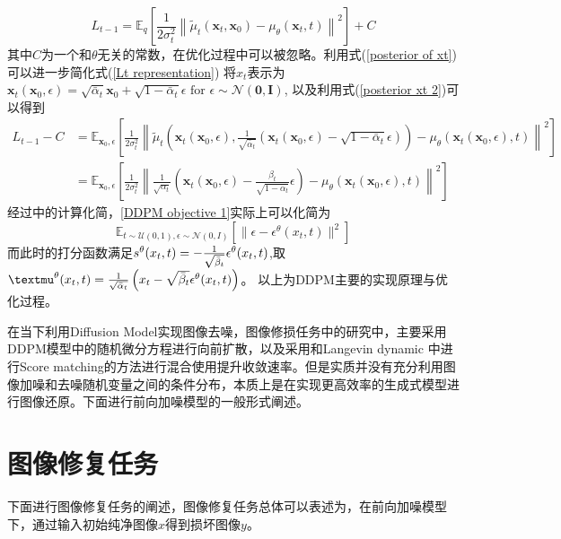 \begin{equation}
    L_{t-1}=\mathbb{E}_q\left[\frac{1}{2 \sigma_t^2}\left\|\tilde{{\mu}}_t\left(\mathbf{x}_t, \mathbf{x}_0\right)-{\mu}_\theta\left(\mathbf{x}_t, t\right)\right\|^2\right]+C
    \label{Lt representation}
\end{equation}
其中$C$为一个和$\theta$无关的常数，在优化过程中可以被忽略。利用式(\ref{posterior of xt})可以进一步简化式(\ref{Lt representation}) 将$x_t$表示为$\mathbf{x}_t\left(\mathbf{x}_0, {\epsilon}\right)=\sqrt{\bar{\alpha}_t} \mathbf{x}_0+\sqrt{1-\bar{\alpha}_t} {\epsilon} \text { for } {\epsilon} \sim \mathcal{N}(\mathbf{0}, \mathbf{I}) $, 以及利用式(\ref{posterior xt 2})可以得到
\begin{align}
    L_{t-1}-C&=\mathbb{E}_{\mathbf{x}_0, {\epsilon}}\left[\frac{1}{2 \sigma_t^2}\left\|\tilde{{\mu}}_t\left(\mathbf{x}_t\left(\mathbf{x}_0, {\epsilon}\right), \frac{1}{\sqrt{\bar{\alpha}_t}}\left(\mathbf{x}_t\left(\mathbf{x}_0, {\epsilon}\right)-\sqrt{1-\bar{\alpha}_t} {\epsilon}\right)\right)-{\mu}_\theta\left(\mathbf{x}_t\left(\mathbf{x}_0, {\epsilon}\right), t\right)\right\|^2\right]\\
&=\mathbb{E}_{\mathbf{x}_0, {\epsilon}}\left[\frac{1}{2 \sigma_t^2}\left\|\frac{1}{\sqrt{\alpha_t}}\left(\mathbf{x}_t\left(\mathbf{x}_0, {\epsilon}\right)-\frac{\beta_t}{\sqrt{1-\bar{\alpha}_t}} {\epsilon}\right)-{\mu}_\theta\left(\mathbf{x}_t\left(\mathbf{x}_0, {\epsilon}\right), t\right)\right\|^2\right]
\end{align}
经过\cite{DDPM,score_based_SDE}中的计算化简，\ref{DDPM objective 1}实际上可以化简为
\begin{equation}
    \mathbb{E}_{t\sim \mathcal{U}(0,1),\epsilon\sim \mathcal{N}(0,I)}\left[\|\epsilon - \epsilon^{\theta}(x_t,t)\|^2\right]
\end{equation}
而此时的打分函数满足$s^{\theta}(x_t,t) =- \frac{1}{\sqrt{\Bar{\beta}_t}}\epsilon^{\theta}(x_t,t)$,取 $\mu^{\theta}(x_t,t) = \frac{1}{\sqrt{\Bar{\alpha}_t}}\left(x_t- \sqrt{\Bar{\beta}_t}\epsilon^{\theta}(x_t,t)\right)$。 以上为DDPM主要的实现原理与优化过程。

在当下利用Diffusion Model实现图像去噪，图像修损任务中的研究中，主要采用DDPM模型中的随机微分方程进行向前扩散，以及采用和Langevin dynamic 中进行Score matching的方法进行混合使用提升收敛速率。但是实质并没有充分利用图像加噪和去噪随机变量之间的条件分布，本质上是在实现更高效率的生成式模型进行图像还原。下面进行前向加噪模型的一般形式阐述。
\section{图像修复任务}
下面进行图像修复任务的阐述，图像修复任务总体可以表述为，在前向加噪模型下，通过输入初始纯净图像$x$得到损坏图像$y$。

